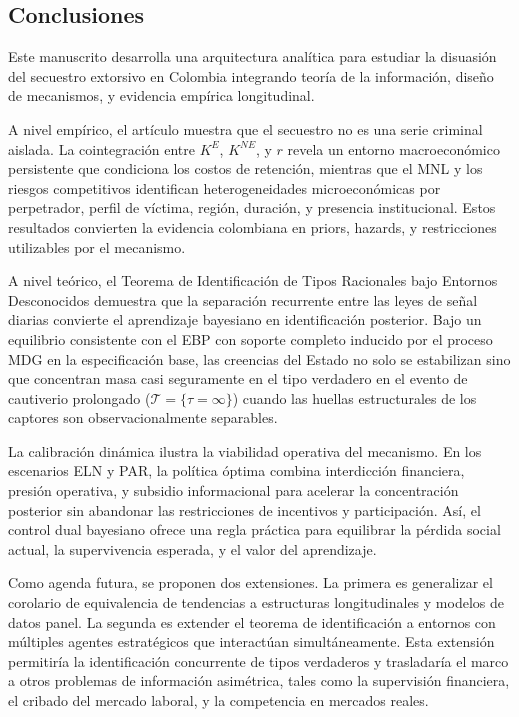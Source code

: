 \documentclass[review,authoryear,12pt]{elsarticle}
\theoremstyle{plain}
\theoremstyle{definition}
\newcommand{\1}{\mathbf{1}}
\begin{document}
\subsection{Conclusiones}

Este manuscrito desarrolla una arquitectura analítica para estudiar la disuasión del secuestro extorsivo en Colombia integrando teoría de la información, diseño de mecanismos, y evidencia empírica longitudinal.

A nivel empírico, el artículo muestra que el secuestro no es una serie criminal aislada. La cointegración entre $K^E$, $K^{NE}$, y $r$ revela un entorno macroeconómico persistente que condiciona los costos de retención, mientras que el MNL y los riesgos competitivos identifican heterogeneidades microeconómicas por perpetrador, perfil de víctima, región, duración, y presencia institucional. Estos resultados convierten la evidencia colombiana en priors, hazards, y restricciones utilizables por el mecanismo.

A nivel teórico, el Teorema de Identificación de Tipos Racionales bajo Entornos Desconocidos demuestra que la separación recurrente entre las leyes de señal diarias convierte el aprendizaje bayesiano en identificación posterior. Bajo un equilibrio consistente con el EBP con soporte completo inducido por el proceso MDG en la especificación base, las creencias del Estado no solo se estabilizan sino que concentran masa casi seguramente en el tipo verdadero en el evento de cautiverio prolongado ($\mathcal{T}=\{\tau=\infty\}$) cuando las huellas estructurales de los captores son observacionalmente separables.

La calibración dinámica ilustra la viabilidad operativa del mecanismo. En los escenarios ELN y PAR, la política óptima combina interdicción financiera, presión operativa, y subsidio informacional para acelerar la concentración posterior sin abandonar las restricciones de incentivos y participación. Así, el control dual bayesiano ofrece una regla práctica para equilibrar la pérdida social actual, la supervivencia esperada, y el valor del aprendizaje.

Como agenda futura, se proponen dos extensiones. La primera es generalizar el corolario de equivalencia de tendencias a estructuras longitudinales y modelos de datos panel. La segunda es extender el teorema de identificación a entornos con múltiples agentes estratégicos que interactúan simultáneamente. Esta extensión permitiría la identificación concurrente de tipos verdaderos y trasladaría el marco a otros problemas de información asimétrica, tales como la supervisión financiera, el cribado del mercado laboral, y la competencia en mercados reales.
\end{document}
